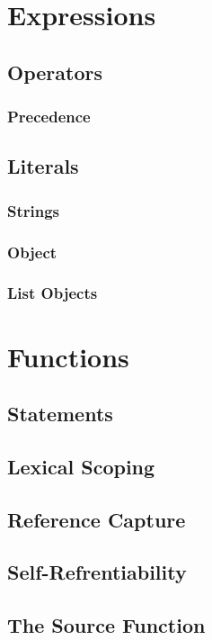 \documentclass[12pt,letterpaper]{report}
\begin{document}
\chapter{Expressions}\label{Expressions}
\section{Operators}\label{Operators}
\subsection{Precedence}\label{Precedence}
\section{Literals}\label{Literals}
\subsection{Strings}\label{Strings}
\subsection{Object}\label{Object}
\subsection{List Objects}\label{List Objects}
\chapter{Functions}\label{Functions}
\section{Statements}\label{Statements}
\section{Lexical Scoping}\label{Lexical Scoping}
\section{Reference Capture}\label{Reference Capture}
\section{Self-Refrentiability}\label{Self-Refrentiability}
\section{The Source Function}\label{The Source Function}
\end{document}

